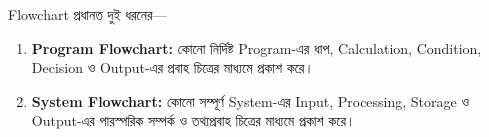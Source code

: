 

Flowchart প্রধানত দুই ধরনের—

\begin{enumerate}

\item
\textbf{Program Flowchart:}
কোনো নির্দিষ্ট Program-এর ধাপ, Calculation, Condition,
Decision ও Output-এর প্রবাহ চিত্রের মাধ্যমে প্রকাশ করে।

\item
\textbf{System Flowchart:}
কোনো সম্পূর্ণ System-এর Input, Processing, Storage ও Output-এর
পারস্পরিক সম্পর্ক ও তথ্যপ্রবাহ চিত্রের মাধ্যমে প্রকাশ করে।

\end{enumerate}



